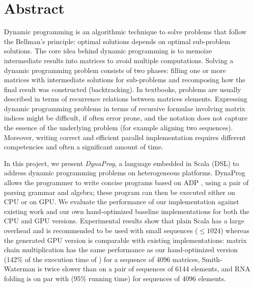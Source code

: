 \section*{Abstract}
Dynamic programming is an algorithmic technique to solve problems that follow the Bellman's principle\cite{bellman_principle}: optimal solutions depends on optimal sub-problem solutions. The core idea behind dynamic programming is to memoize intermediate results into matrices to avoid multiple computations. Solving a dynamic programming problem consists of two phases: filling one or more matrices with intermediate solutions for sub-problems and recomposing how the final result was constructed (backtracking). In textbooks, problems are usually described in terms of recurrence relations between matrices elements. Expressing dynamic programming problems in terms of recursive formulae involving matrix indices might be difficult, if often error prone, and the notation does not capture the essence of the underlying problem (for example aligning two sequences). Moreover, writing correct and efficient parallel implementation requires different competencies and often a significant amount of time.

In this project, we present \textit{DynaProg}, a language embedded in Scala (DSL) to address dynamic programming problems on heterogeneous platforms. DynaProg allows the programmer to write concise programs based on ADP \cite{adp}, using a pair of parsing grammar and algebra; these program can then be executed either on CPU or on GPU. We evaluate the performance of our implementation against existing work and our own hand-optimized baseline implementations for both the CPU and GPU versions. Experimental results show that plain Scala has a large overhead and is recommended to be used with small sequences ($\le 1024$) whereas the generated GPU version is comparable with existing implementations: matrix chain multiplication has the same performance as our hand-optimized version (142\% of the execution time of \cite{gpu_atlp}) for a sequence of 4096 matrices, Smith-Waterman is twice slower than \cite{swat_linear} on a pair of sequences of 6144 elements, and  RNA folding is on par with \cite{gpu_rnafold} (95\% running time) for sequences of 4096 elements.


\vfill
